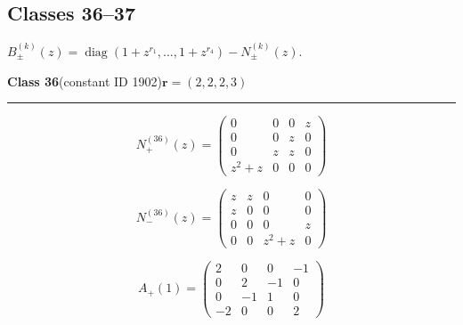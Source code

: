 \subsection*{Classes 36--37}
\noindent $B_\pm^{(k)}(z)=\operatorname{diag}(1+z^{r_1},\ldots,1+z^{r_4})-N_\pm^{(k)}(z)$.\par\medskip
\noindent\begin{minipage}{\linewidth}
\noindent\textbf{Class 36}\quad\small (constant ID 1902)\hfill $\symbf{r}=(2,2,2,3)$
\par\smallskip\noindent\textcolor{rulegray}{\rule{\linewidth}{0.3pt}}
\begin{minipage}[c]{0.495\linewidth}\centering\fontsize{9.7}{12}\selectfont
\setlength{\abovedisplayskip}{4pt}\setlength{\belowdisplayskip}{4pt}
\setlength{\abovedisplayshortskip}{4pt}\setlength{\belowdisplayshortskip}{4pt}
\setlength{\arraycolsep}{3pt}\renewcommand{\arraystretch}{1.08}
\[N_{+}^{(36)}(z)=\begin{pmatrix}0 & 0 & 0 & z\\0 & 0 & z & 0\\0 & z & z & 0\\z^{2} + z & 0 & 0 & 0\end{pmatrix}\]
\end{minipage}%
\begin{minipage}[c]{0.495\linewidth}\centering\fontsize{9.7}{12}\selectfont
\setlength{\abovedisplayskip}{4pt}\setlength{\belowdisplayskip}{4pt}
\setlength{\abovedisplayshortskip}{4pt}\setlength{\belowdisplayshortskip}{4pt}
\setlength{\arraycolsep}{3pt}\renewcommand{\arraystretch}{1.08}
\[N_{-}^{(36)}(z)=\begin{pmatrix}z & z & 0 & 0\\z & 0 & 0 & 0\\0 & 0 & 0 & z\\0 & 0 & z^{2} + z & 0\end{pmatrix}\]
\end{minipage}%
\par\noindent
\begin{minipage}[c]{0.495\linewidth}\centering\fontsize{9.7}{12}\selectfont
\setlength{\abovedisplayskip}{4pt}\setlength{\belowdisplayskip}{4pt}
\setlength{\abovedisplayshortskip}{4pt}\setlength{\belowdisplayshortskip}{4pt}
\setlength{\arraycolsep}{3pt}\renewcommand{\arraystretch}{1.08}
\[A_{+}(1)=\begin{pmatrix}2 & 0 & 0 & -1\\0 & 2 & -1 & 0\\0 & -1 & 1 & 0\\-2 & 0 & 0 & 2\end{pmatrix}\]

\end{minipage}
\end{minipage}
